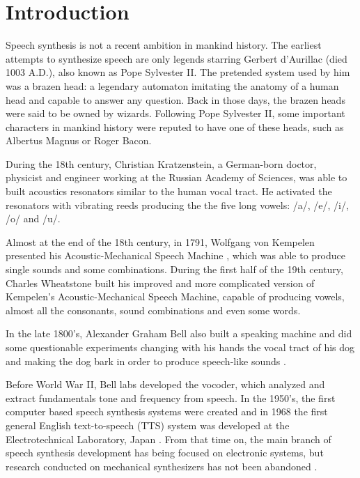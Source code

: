 \section{Introduction}
\label{intro}
\thispagestyle{empty}

Speech synthesis is not a recent ambition in mankind history. The earliest attempts to synthesize speech are only legends starring Gerbert d'Aurillac (died 1003 A.D.), also known as Pope Sylvester II. The pretended system used by him was a brazen head: a legendary automaton imitating the anatomy of a human head and capable to answer any question. Back in those days, the brazen heads were said to be owned by wizards. Following Pope Sylvester II, some important characters in mankind history  were reputed to have one of these heads, such as Albertus Magnus or Roger Bacon.

During the 18th century, Christian Kratzenstein, a German-born doctor, physicist and engineer working at the Russian Academy of Sciences, was able to built acoustics resonators similar to the human vocal tract. He activated the resonators with vibrating reeds producing the the five long vowels: /a/, /e/, /i/, /o/ and /u/.

Almost at the end of the 18th century, in 1791, Wolfgang von Kempelen presented his Acoustic-Mechanical Speech Machine \cite{vonKempelen}, which was able to produce single sounds and some combinations. During the first half of the 19th century, Charles Wheatstone built his improved and more complicated version of Kempelen's Acoustic-Mechanical Speech Machine, capable of producing vowels, almost all the consonants, sound combinations and even some words.	

In the late 1800's, Alexander Graham Bell also built a speaking machine and did some questionable experiments changing with his hands the vocal tract of his dog and making the dog bark in order to produce speech-like sounds \cite{Schroeder93, LemmettyMSc}.

Before World War II, Bell labs developed the vocoder, which analyzed and extract fundamentals tone and frequency from speech. In the 1950's, the first computer based speech synthesis systems were created and in 1968 the first general English text-to-speech (TTS) system was developed at the Electrotechnical Laboratory, Japan \cite{Klatt87}. From that time on, the main branch of speech synthesis development has being focused on electronic systems, but research conducted on mechanical synthesizers has not been abandoned \cite{mechSynthWeb, mechSynth}.

